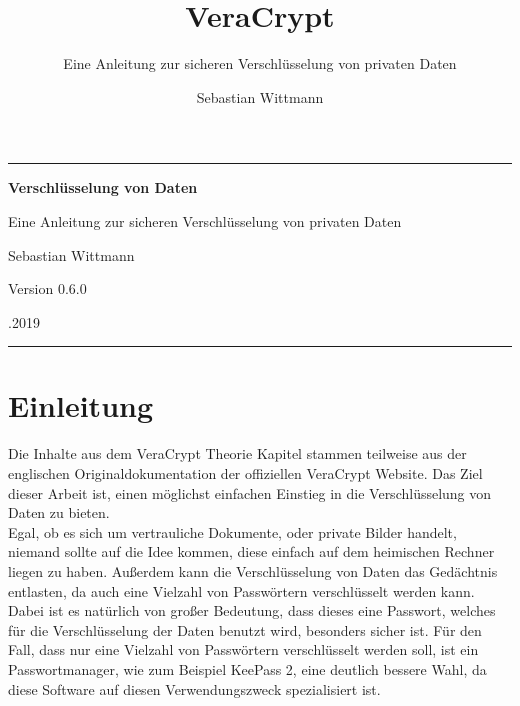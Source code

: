 \documentclass[12pt,a4paper]{scrreprt}
\author{Sebastian Wittmann}
\title{VeraCrypt}
\subtitle{Eine Anleitung zur sicheren Verschlüsselung von privaten Daten}
\begin{document}
\begin{titlepage}
\begin{center}
\noindent\rule{470pt}{0.4pt}\par
\vspace{6cm}
{\fontsize{29.86pt}{29.86pt}\selectfont \textbf{Verschlüsselung von Daten}} \par
\vspace{0.5cm}
{\fontsize{17.28pt}{17.28pt}\selectfont Eine Anleitung zur sicheren Verschlüsselung von privaten Daten}\par
\vspace{3cm}
{\fontsize{20.74pt}{20.74pt}\selectfont Sebastian Wittmann} \par
\vspace{2cm}
{\fontsize{14pt}{14pt}\selectfont Version 0.6.0}\par
\vspace{10cm}
{\fontsize{14pt}{14pt}.2019}
\noindent\rule{470pt}{0.4pt}
\end{center}
\end{titlepage}
\tableofcontents

\chapter{Einleitung}
Die Inhalte aus dem VeraCrypt Theorie Kapitel stammen teilweise aus der englischen Originaldokumentation der offiziellen VeraCrypt Website. Das Ziel dieser Arbeit ist, einen möglichst einfachen Einstieg in die Verschlüsselung von Daten zu bieten.\\

\noindent Egal, ob es sich um vertrauliche Dokumente, oder private Bilder handelt, niemand sollte auf die Idee kommen, diese einfach auf dem heimischen Rechner liegen zu haben. Außerdem kann die Verschlüsselung von Daten das Gedächtnis entlasten, da auch eine Vielzahl von Passwörtern verschlüsselt werden kann. Dabei ist es natürlich von großer Bedeutung, dass dieses eine Passwort, welches für die Verschlüsselung der Daten benutzt wird, besonders sicher ist. Für den Fall, dass nur eine Vielzahl von Passwörtern verschlüsselt werden soll, ist ein Passwortmanager, wie zum Beispiel KeePass 2, eine deutlich bessere Wahl, da diese Software auf diesen Verwendungszweck spezialisiert ist.\\
\end{document}
